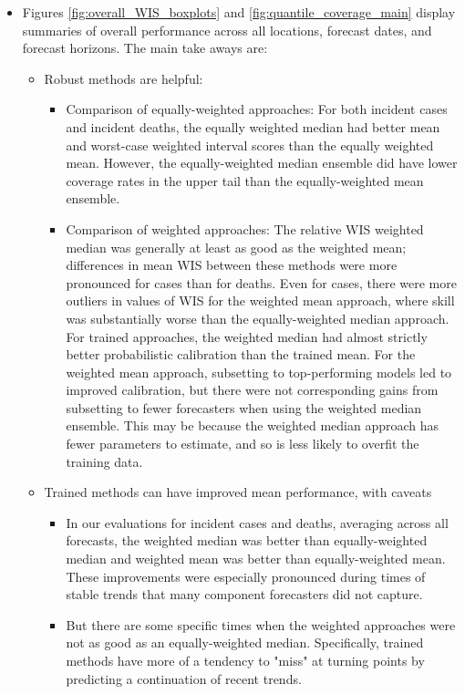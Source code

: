 \documentclass[review]{elsarticle}
\begin{document}
\begin{itemize}
  \item Figures \ref{fig:overall_WIS_boxplots} and \ref{fig:quantile_coverage_main} display summaries of overall performance across all locations, forecast dates, and forecast horizons.  The main take aways are:
  \begin{itemize}
    \item Robust methods are helpful:
    \begin{itemize}
      \item Comparison of equally-weighted approaches: For both incident cases and incident deaths, the equally weighted median had better mean and worst-case weighted interval scores than the equally weighted mean.  However, the equally-weighted median ensemble did have lower coverage rates in the upper tail than the equally-weighted mean ensemble.
      \item Comparison of weighted approaches: The relative WIS weighted median was generally at least as good as the weighted mean; differences in mean WIS between these methods were more pronounced for cases than for deaths.  Even for cases, there were more outliers in values of WIS for the weighted mean approach, where skill was substantially worse than the equally-weighted median approach.  For trained approaches, the weighted median had almost strictly better probabilistic calibration than the trained mean.  For the weighted mean approach, subsetting to top-performing models led to improved calibration, but there were not corresponding gains from subsetting to fewer forecasters when using the weighted median ensemble. This may be because the weighted median approach has fewer parameters to estimate, and so is less likely to overfit the training data.
    \end{itemize}
    \item Trained methods can have improved mean performance, with caveats
    \begin{itemize}
      \item In our evaluations for incident cases and deaths, averaging across all forecasts, the weighted median was better than equally-weighted median and weighted mean was better than equally-weighted mean.  These improvements were especially pronounced during times of stable trends that many component forecasters did not capture.
      \item But there are some specific times when the weighted approaches were not as good as an equally-weighted median.  Specifically, trained methods have more of a tendency to "miss" at turning points by predicting a continuation of recent trends.

\end{itemize}
\end{itemize}
\end{itemize}
\end{document}
